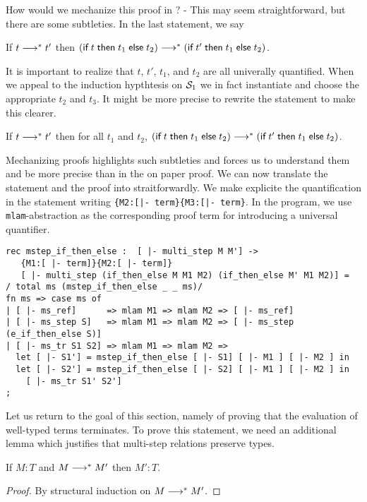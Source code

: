 How would we mechanize this proof in \beluga? - This may seem
straightforward, but there are some subtleties. In the last statement,
we say

\begin{center}
If $t \MSteps t'$ then $(\tmif t {t_1} {t_2}) \MSteps (\tmif {t'} {t_1} {t_2})$.
\end{center}

It is important to realize that $t$, $t'$, $t_1$, and $t_2$ are all
univerally quantified.  When we appeal to the induction hypthtesis on
$\S_1$ we in fact instantiate and choose the appropriate $t_2$ and
$t_3$. It might be more precise to rewrite the statement to make this clearer.

\begin{center}
If $t \MSteps t'$ then for all $t_1$ and $t_2$, $(\tmif t {t_1} {t_2}) \MSteps (\tmif {t'} {t_1} {t_2})$.
\end{center}

Mechanizing proofs highlights such subtleties and forces us to
understand them and be more precise than in the on paper proof. We can
now translate the statement and the proof into
\beluga straitforwardly. We make explicite the quantification in the
statement writing \lstinline!{M2:[|- term}{M3:[|- term}!. In the
program, we use \lstinline!mlam!-abstraction as the corresponding
proof term for introducing a universal quantifier.

\begin{lstlisting}
rec mstep_if_then_else :  [ |- multi_step M M'] ->
   {M1:[ |- term]}{M2:[ |- term]}
   [ |- multi_step (if_then_else M M1 M2) (if_then_else M' M1 M2)] =
/ total ms (mstep_if_then_else _ _ ms)/
fn ms => case ms of
| [ |- ms_ref]      => mlam M1 => mlam M2 => [ |- ms_ref]
| [ |- ms_step S]   => mlam M1 => mlam M2 => [ |- ms_step (e_if_then_else S)]
| [ |- ms_tr S1 S2] => mlam M1 => mlam M2 =>
  let [ |- S1'] = mstep_if_then_else [ |- S1] [ |- M1 ] [ |- M2 ] in
  let [ |- S2'] = mstep_if_then_else [ |- S2] [ |- M1 ] [ |- M2 ] in
    [ |- ms_tr S1' S2']
;
\end{lstlisting}


Let us return to the goal of this section, namely of proving that the
evaluation of well-typed terms terminates. To prove this statement, we
need an additional lemma which justifies that multi-step relations
preserve types.

\begin{lemma}
If $M : T$ and $M \MSteps M'$ then $M':T$.
\end{lemma}
\begin{proof}
By structural induction on $M \MSteps M'$.
\end{proof}


